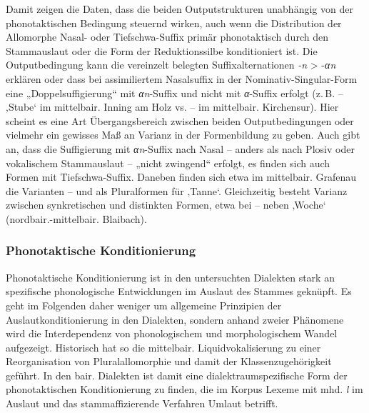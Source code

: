 Damit zeigen die Daten, dass die beiden Outputstrukturen unabhängig von der phonotaktischen Bedingung steuernd wirken, auch wenn die Distribution der Allomorphe Nasal- oder Tiefschwa-Suffix primär phonotaktisch durch den Stammauslaut oder die Form der Reduktionssilbe konditioniert ist. Die Outputbedingung kann die vereinzelt belegten Suffixalternationen \textit{{}-n} > {}-\textit{αn} erklären oder dass bei assimiliertem Nasalsuffix in der Nominativ-Singular-Form eine „Doppelsuffigierung“ mit \textit{αn}{}-Suffix und nicht mit \textit{α}{}-Suffix erfolgt (z.\,B.  --  ‚Stube‘ im mittelbair. Inning am Holz vs.  --  im mittelbair. Kirchensur). Hier scheint es eine Art Übergangsbereich zwischen beiden Outputbedingungen oder vielmehr ein gewisses Maß an Varianz in der Formenbildung zu geben. Auch \citet[153]{Rowley1997} gibt an, dass die Suffigierung mit \textit{αn}{}-Suffix nach Nasal -- anders als nach Plosiv oder vokalischem Stammauslaut -- „nicht zwingend“ erfolgt, es finden sich auch Formen mit Tiefschwa-Suffix. Daneben finden sich etwa im mittelbair. Grafenau die Varianten  --  und  als Pluralformen für ‚Tanne‘. Gleichzeitig besteht Varianz zwischen synkretischen und distinkten Formen, etwa bei  --  neben  ‚Woche‘ (nordbair.-mittelbair. Blaibach).

\subsubsection{Phonotaktische Konditionierung}
\label{sec:8.3.3.2}
Phonotaktische Konditionierung ist in den untersuchten Dialekten stark an spezifische phonologische Entwicklungen im Auslaut des Stammes geknüpft. Es geht im Folgenden daher weniger um allgemeine Prinzipien der Auslautkonditionierung in den Dialekten, sondern anhand zweier Phänomene wird die Interdependenz von phonologischem und morphologischem Wandel aufgezeigt. Historisch hat so die mittelbair. Liquidvokalisierung zu einer Reorganisation von Pluralallomorphie und damit der Klassenzugehörigkeit geführt. In den bair. Dialekten ist damit eine dialektraumspezifische Form der phonotaktischen Konditionierung zu finden, die im Korpus Lexeme mit mhd. {\textit{l}} im Auslaut und das stammaffizierende Verfahren Umlaut betrifft.

